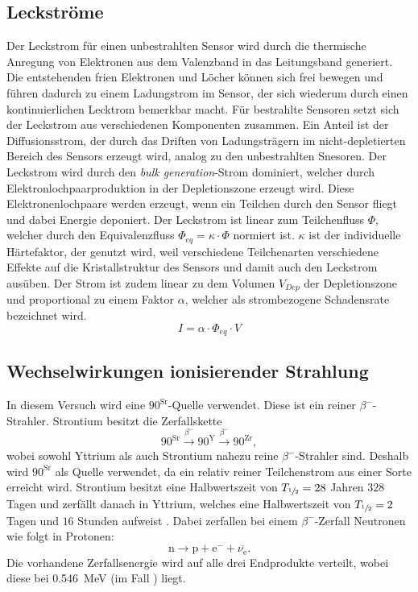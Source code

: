 \subsection{Leckströme}
Der Leckstrom für einen unbestrahlten Sensor wird durch die thermische Anregung von Elektronen aus dem Valenzband in das Leitungsband generiert. Die entstehenden frien Elektronen und Löcher können sich frei bewegen und führen dadurch zu einem Ladungstrom im Sensor, der sich wiederum durch einen kontinuierlichen Lecktrom bemerkbar macht. Für bestrahlte Sensoren setzt sich der Leckstrom aus verschiedenen Komponenten zusammen. Ein Anteil ist der Diffusionsstrom, der durch das Driften von Ladungsträgern im nicht-depletierten Bereich des Sensors erzeugt wird, analog zu den unbestrahlten Snesoren. Der Leckstrom wird durch den \textit{bulk generation}-Strom dominiert, welcher durch Elektronlochpaarproduktion in der Depletionszone erzeugt wird. Diese Elektronenlochpaare werden erzeugt, wenn ein Teilchen durch den Sensor fliegt und dabei Energie deponiert. Der Leckstrom ist linear zum Teilchenfluss $\Phi$, welcher durch den Equivalenzfluss $\Phi_{eq} = \kappa \cdot \Phi$ normiert ist. $\kappa$ ist der individuelle Härtefaktor, der genutzt wird, weil verschiedene Teilchenarten verschiedene Effekte auf die Kristallstruktur des Sensors und damit auch den Leckstrom ausüben.  Der Strom ist zudem linear zu dem Volumen $V_{Dep}$ der Depletionszone und proportional zu einem Faktor $\alpha$, welcher als strombezogene Schadensrate bezeichnet wird.
\begin{equation}
	I = \alpha \cdot \Phi_{eq} \cdot V
\end{equation}

\subsection{Wechselwirkungen ionisierender Strahlung}
In diesem Versuch wird eine ${90}^\text{Sr}$-Quelle verwendet. Diese ist ein reiner $\beta^{-}$-Strahler. Strontium besitzt die Zerfallskette
\begin{equation*}
  {90}^\text{Sr} \stackrel{\beta^{-}}{\longrightarrow} {90}^\text{Y}
  \stackrel{\beta^{-}}{\longrightarrow} {90}^\text{Zr},
\end{equation*}
wobei sowohl Yttrium als auch Strontium nahezu reine $\beta^{-}$-Strahler sind. Deshalb wird ${90}^\text{Sr}$ als Quelle verwendet, da ein relativ reiner Teilchenstrom aus einer Sorte erreicht wird. Strontium besitzt eine Halbwertszeit von $T_{\sfrac{1}{2}} = 28$ Jahren $328$ Tagen und zerfällt danach in Yttrium, welches eine Halbwertszeit von $T_{\sfrac{1}{2}} = 2$ Tagen und $16$ Stunden aufweist \cite{periodensystem}. Dabei zerfallen bei einem $\beta^{-}$-Zerfall Neutronen wie folgt in Protonen:
\begin{equation*}
  \text{n} \rightarrow \text{p} + \text{e}^{-} + \overline{\nu_\text{e}}.
\end{equation*}
Die vorhandene Zerfallsenergie wird auf alle drei Endprodukte verteilt, wobei diese bei \SI{0.546}{\mega\electronvolt} (im Fall ) liegt.

